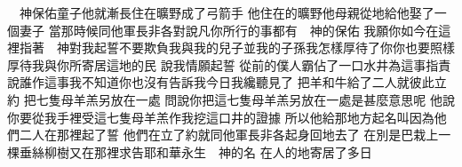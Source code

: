 　神保佑童子\chientien 他就漸長\chientien 住在曠野\chientien 成了弓箭手\chuan 
{}他住在的曠野\chientien 他母親從地給他娶了一個妻子\chuan\Chuan
{}當那時候\chientien{}同他軍長非各\chientien 對說\chientien 凡你所行的事\chientien 都有　神的保佑\chuan 
{}我願你如今在這裡指著　神對我起誓\chientien 不要欺負我與我的兒子\chientien 並我的子孫\chientien 我怎樣厚待了你\chientien 你也要照樣厚待我\chientien 與你所寄居這地的民\chuan 
{}說\chientien 我情願起誓\chuan 
{}從前的僕人\chientien 霸佔了一口水井\chientien{}為這事指責\chuan 
{}說\chientien 誰作這事我不知道\chientien 你也沒有告訴我\chientien 今日我纔聽見了\chuan 
{}把羊和牛給了\chientien 二人就彼此立約\chuan 
{}把七隻母羊羔另放在一處\chuan 
{}問說\chientien 你把這七隻母羊羔另放在一處\chientien 是甚麼意思呢\chuan 
{}他說\chientien 你要從我手裡受這七隻母羊羔\chientien 作我挖這口井的證據\chuan 
{}所以他給那地方起名叫\chientien 因為他們二人在那裡起了誓\chuan{}
他們在立了約\yuentien{}就同他軍長非各\chientien 起身回地去了\chuan 
{}在別是巴栽上一棵垂絲柳樹\chientien 又在那裡求告耶和華永生　神的名\chuan 
{}在人的地寄居了多日\chuan 
